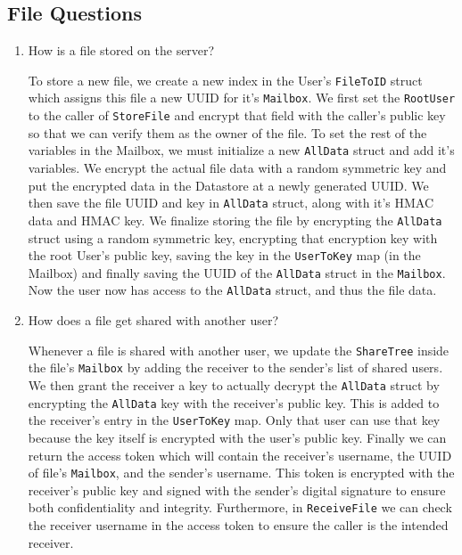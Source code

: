 \documentclass{article}
\begin{document}
\subsection{File Questions}
    \begin{enumerate}
        \item How is a file stored on the server?
        
        To store a new file, we create a new index in the User's \texttt{FileToID} struct which assigns this file a new UUID for it's \texttt{Mailbox}. We first set the \texttt{RootUser} to the caller of \texttt{StoreFile} and encrypt that field with the caller's public key so that we can verify them as the owner of the file. To set the rest of the variables in the Mailbox, we must initialize a new \texttt{AllData} struct and add it's variables. We encrypt the actual file data with a random symmetric key and put the encrypted data in the Datastore at a newly generated UUID. We then save the file UUID and key in \texttt{AllData} struct, along with it's HMAC data and HMAC key. We finalize storing the file by encrypting the \texttt{AllData} struct using a random symmetric key, encrypting that encryption key with the root User's public key, saving the key in the \texttt{UserToKey} map (in the Mailbox) and finally saving the UUID of the \texttt{AllData} struct in the \texttt{Mailbox}. Now the user now has access to the \texttt{AllData} struct, and thus the file data.
        
        \item How does a file get shared with another user?
        
        Whenever a file is shared with another user, we update the \texttt{ShareTree} inside the file's \texttt{Mailbox} by adding the receiver to the sender's list of shared users. We then grant the receiver a key to actually decrypt the \texttt{AllData} struct by  encrypting the \texttt{AllData} key with the receiver's public key. This is added to the receiver's entry in the \texttt{UserToKey} map. Only that user can use that key because the key itself is encrypted with the user's public key. Finally we can return the access token which will contain the receiver's username, the UUID of file's \texttt{Mailbox}, and the sender's username. This token is encrypted with the receiver's public key and signed with the sender's digital signature to ensure both confidentiality and integrity. Furthermore, in \texttt{ReceiveFile} we can check the receiver username in the access token to ensure the caller is the intended receiver.
         

\end{enumerate}
\end{document}
